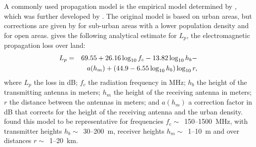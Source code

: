 \documentclass[useAMS,usenatbib]{mn2e}
\begin{document}
A commonly used propagation model is the empirical model determined by \citet{okumura-propagation-model}, which was further developed by \citet{hata-propagation-loss}. The original model is based on urban areas, but corrections are given by \citeauthor{hata-propagation-loss} for sub-urban areas with a lower population density and for open areas. \citeauthor{hata-propagation-loss} gives the following analytical estimate for $L_p$, the electromagnetic propagation loss over land:
\begin{align} 
\notag                L_p & = & 69.55 + 26.16 \log_{10} f_c - 13.82 \log_{10} h_b - \\
\label{eq:hata-model} & &  a(h_m) + (44.9 - 6.55 \log_{10} h_b) \log_{10} r, 
\end{align}
where $L_p$ the loss in dB; $f_c$ the radiation frequency in MHz; $h_b$ the height of the transmitting antenna in meters; $h_m$ the height of the receiving antenna in meters; $r$ the distance between the antennas in meters; and $a(h_m)$ a correction factor in dB that corrects for the height of the receiving antenna and the urban density. \citeauthor{hata-propagation-loss} found this model to be representative for frequencies $f_c \sim$~150--1500~MHz, with transmitter heights $h_b \sim$~30--200~m, receiver heights $h_m \sim$~1--10~m and over distances $r\sim$~1--20~km.
\end{document}
